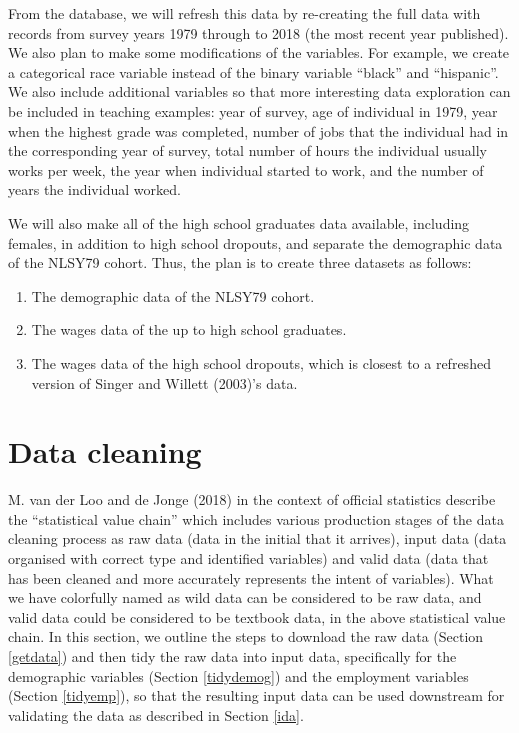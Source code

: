 \documentclass{article}
\providecommand{\tightlist}{%
  \setlength{\itemsep}{0pt}\setlength{\parskip}{0pt}}
\begin{document}
From the database, we will refresh this data by re-creating the full data with records from survey years 1979 through to 2018 (the most recent year published). We also plan to make some modifications of the variables. For example, we create a categorical race variable instead of the binary variable ``black'' and ``hispanic''. We also include additional variables so that more interesting data exploration can be included in teaching examples: year of survey, age of individual in 1979, year when the highest grade was completed, number of jobs that the individual had in the corresponding year of survey, total number of hours the individual usually works per week, the year when individual started to work, and the number of years the individual worked.

We will also make all of the high school graduates data available, including females, in addition to high school dropouts, and separate the demographic data of the NLSY79 cohort. Thus, the plan is to create three datasets as follows:

\begin{enumerate}
\def\labelenumi{\arabic{enumi}.}
\tightlist
\item
  The demographic data of the NLSY79 cohort.
\item
  The wages data of the up to high school graduates.
\item
  The wages data of the high school dropouts, which is closest to a refreshed version of Singer and Willett (2003)'s data.
\end{enumerate}

\hypertarget{cleaning}{%
\section{Data cleaning}\label{cleaning}}

M. van der Loo and de Jonge (2018) in the context of official statistics describe the ``statistical value chain'' which includes various production stages of the data cleaning process as raw data (data in the initial that it arrives), input data (data organised with correct type and identified variables) and valid data (data that has been cleaned and more accurately represents the intent of variables). What we have colorfully named as wild data can be considered to be raw data, and valid data could be considered to be textbook data, in the above statistical value chain. In this section, we outline the steps to download the raw data (Section \ref{getdata}) and then tidy the raw data into input data, specifically for the demographic variables (Section \ref{tidydemog}) and the employment variables (Section \ref{tidyemp}), so that the resulting input data can be used downstream for validating the data as described in Section \ref{ida}.
\end{document}
